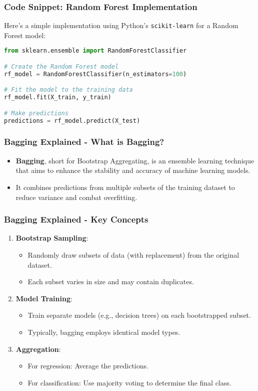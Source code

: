 \documentclass[aspectratio=169]{beamer}
\begin{document}
\begin{frame}[fragile]
    \frametitle{Code Snippet: Random Forest Implementation}
    Here’s a simple implementation using Python’s \texttt{scikit-learn} for a Random Forest model:
    \begin{lstlisting}[language=Python]
from sklearn.ensemble import RandomForestClassifier

# Create the Random Forest model
rf_model = RandomForestClassifier(n_estimators=100)

# Fit the model to the training data
rf_model.fit(X_train, y_train)

# Make predictions
predictions = rf_model.predict(X_test)
    \end{lstlisting}
\end{frame}

\begin{frame}[fragile]
    \frametitle{Bagging Explained - What is Bagging?}
    \begin{itemize}
        \item \textbf{Bagging}, short for Bootstrap Aggregating, is an ensemble learning technique that aims to enhance the stability and accuracy of machine learning models.
        \item It combines predictions from multiple subsets of the training dataset to reduce variance and combat overfitting.
    \end{itemize}
\end{frame}

\begin{frame}[fragile]
    \frametitle{Bagging Explained - Key Concepts}
    \begin{enumerate}
        \item \textbf{Bootstrap Sampling}:
            \begin{itemize}
                \item Randomly draw subsets of data (with replacement) from the original dataset.
                \item Each subset varies in size and may contain duplicates.
            \end{itemize}
            
        \item \textbf{Model Training}:
            \begin{itemize}
                \item Train separate models (e.g., decision trees) on each bootstrapped subset.
                \item Typically, bagging employs identical model types.
            \end{itemize}
            
        \item \textbf{Aggregation}:
            \begin{itemize}
                \item For regression: Average the predictions.
                \item For classification: Use majority voting to determine the final class.
            \end{itemize}
    \end{enumerate}
\end{frame}
\end{document}
